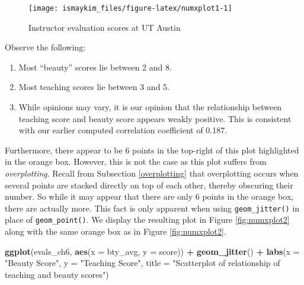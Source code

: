 \documentclass[12pt, krantz2,]{krantz}
\makeatletter
\newenvironment{Shaded}{\begin{snugshade}}{\end{snugshade}}
\newcommand{\DataTypeTok}[1]{\textcolor[rgb]{0.27,0.27,0.27}{#1}}
\newcommand{\KeywordTok}[1]{\textcolor[rgb]{0.27,0.27,0.27}{\textbf{#1}}}
\newcommand{\NormalTok}[1]{#1}
\newcommand{\OperatorTok}[1]{\textcolor[rgb]{0.43,0.43,0.43}{\textbf{#1}}}
\newcommand{\StringTok}[1]{\textcolor[rgb]{0.5,0.5,0.5}{#1}}
\providecommand{\tightlist}{%
  \setlength{\itemsep}{0pt}\setlength{\parskip}{0pt}}
\newenvironment{kframe}{%
\medskip{}
\setlength{\fboxsep}{.8em}
 \def\at@end@of@kframe{}%
 \ifinner\ifhmode%
  \def\at@end@of@kframe{\end{minipage}}%
  \begin{minipage}{\columnwidth}%
 \fi\fi%
 \def\FrameCommand##1{\hskip\@totalleftmargin \hskip-\fboxsep
 \colorbox{shadecolor}{##1}\hskip-\fboxsep
     \hskip-\linewidth \hskip-\@totalleftmargin \hskip\columnwidth}%
 \MakeFramed {\advance\hsize-\width
   \@totalleftmargin\z@ \linewidth\hsize
   \@setminipage}}%
 {\par\unskip\endMakeFramed%
 \at@end@of@kframe}
\renewenvironment{Shaded}{\begin{kframe}}{\end{kframe}}
\makeatother
\begin{document}
\begin{figure}

{\centering \texttt{[image: ismaykim\_files/figure-latex/numxplot1-1]} 

}

\caption{Instructor evaluation scores at UT Austin}\label{fig:numxplot1}
\end{figure}

Observe the following:

\begin{enumerate}
\def\labelenumi{\arabic{enumi}.}
\tightlist
\item
  Most ``beauty'' scores lie between 2 and 8.
\item
  Most teaching scores lie between 3 and 5.
\item
  While opinions may vary, it is our opinion that the relationship between teaching score and beauty score appears weakly positive. This is consistent with our earlier computed correlation coefficient of 0.187.
\end{enumerate}

Furthermore, there appear to be 6 points in the top-right of this plot highlighted in the orange box. However, this is not the case as this plot suffers from \emph{overplotting}. Recall from Subsection \ref{overplotting} that overplotting occurs when several points are stacked directly on top of each other, thereby obscuring their number. So while it may appear that there are only 6 points in the orange box, there are actually more. This fact is only apparent when using \texttt{geom\_jitter()} in place of \texttt{geom\_point()}. We display the resulting plot in Figure \ref{fig:numxplot2} along with the same orange box as in Figure \ref{fig:numxplot2}.

\begin{Shaded}
\begin{Highlighting}[]
\KeywordTok{ggplot}\NormalTok{(evals_ch6, }\KeywordTok{aes}\NormalTok{(}\DataTypeTok{x =}\NormalTok{ bty_avg, }\DataTypeTok{y =}\NormalTok{ score)) }\OperatorTok{+}
\StringTok{  }\KeywordTok{geom_jitter}\NormalTok{() }\OperatorTok{+}
\StringTok{  }\KeywordTok{labs}\NormalTok{(}\DataTypeTok{x =} \StringTok{"Beauty Score"}\NormalTok{, }\DataTypeTok{y =} \StringTok{"Teaching Score"}\NormalTok{,}
       \DataTypeTok{title =} \StringTok{"Scatterplot of relationship of teaching and beauty scores"}\NormalTok{)}
\end{Highlighting}
\end{Shaded}
\end{document}
